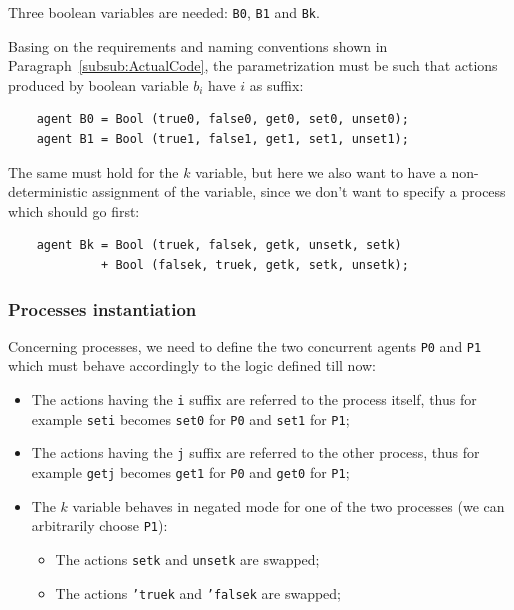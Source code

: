 \documentclass[10pt,a4paper]{article}
\newcommand{\CCSCode}[1]{{\tt #1}}
\newcommand{\Agent}[1]{{\tt {#1}}}
\begin{document}
            Three boolean variables are needed: \Agent{B0},
            \Agent{B1} and \Agent{Bk}.

            Basing on the requirements and naming conventions shown in
            Paragraph~\ref{subsub:ActualCode}, the parametrization must be
            such that actions produced by boolean variable $b_i$ have $i$
            as suffix:
            \begin{verbatim}
    agent B0 = Bool (true0, false0, get0, set0, unset0);
    agent B1 = Bool (true1, false1, get1, set1, unset1);
            \end{verbatim}

            The same must hold for the $k$ variable, but here we also want
            to have a non-deterministic assignment of the variable, since
            we don't want to specify a process which should go first:
            \begin{verbatim}
    agent Bk = Bool (truek, falsek, getk, unsetk, setk)
             + Bool (falsek, truek, getk, setk, unsetk);
            \end{verbatim}

        \subsubsection{Processes instantiation}

            Concerning processes, we need to define the two concurrent
            agents \Agent{P0} and \Agent{P1} which must behave accordingly
            to the logic defined till now:
            \begin{itemize}

            \item   The actions having the \CCSCode{i} suffix are referred
                    to the process itself, thus for example \CCSCode{seti}
                    becomes \CCSCode{set0} for \Agent{P0} and
                    \CCSCode{set1} for \Agent{P1};

            \item   The actions having the \CCSCode{j} suffix are referred
                    to the other process, thus for example \CCSCode{getj}
                    becomes \CCSCode{get1} for \Agent{P0} and
                    \CCSCode{get0} for \Agent{P1};

            \item   The $k$ variable behaves in negated mode for one of
                    the two processes (we can arbitrarily choose
                    \Agent{P1}):

                \begin{itemize}

                \item   The actions \CCSCode{setk} and \CCSCode{unsetk}
                        are swapped;
                \item   The actions \CCSCode{'truek} and \CCSCode{'falsek}
                        are swapped;

                \end{itemize}

            \end{itemize}
\end{document}
